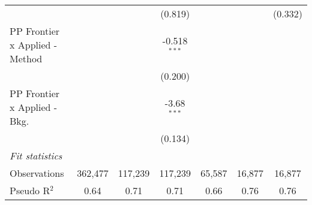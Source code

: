 \begin{tabular}{lcccccc}
                                  &                &               & (0.819)        &                &              & (0.332)\\   
   PP Frontier x Applied - Method &                &               & -0.518$^{***}$ &                &              &   \\   
                                  &                &               & (0.200)        &                &              &   \\   
   PP Frontier x Applied - Bkg.   &                &               & -3.68$^{***}$  &                &              &   \\   
                                  &                &               & (0.134)        &                &              &   \\   
   \midrule
   \emph{Fit statistics}\\
   Observations                   & 362,477        & 117,239       & 117,239        & 65,587         & 16,877       & 16,877\\  
   Pseudo R$^2$                   & 0.64           & 0.71          & 0.71           & 0.66           & 0.76         & 0.76\\  
   

\end{tabular}
